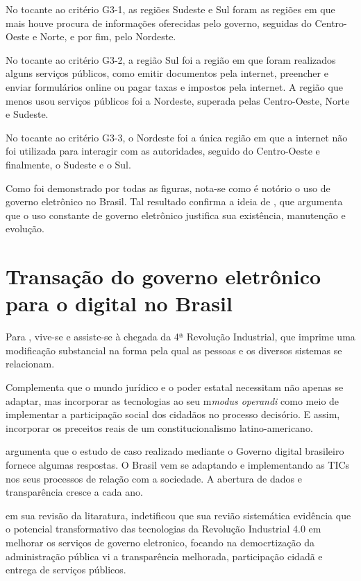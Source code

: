No tocante ao critério G3-1, as regiões Sudeste e Sul foram as regiões em que mais houve procura de informações oferecidas pelo governo, seguidas do Centro-Oeste e Norte, e por fim, pelo Nordeste.

No tocante ao critério G3-2, a região Sul foi a região em que foram realizados alguns serviços públicos, como emitir documentos pela internet, preencher e enviar formulários online ou pagar taxas e impostos pela internet. A região que menos usou serviços públicos foi a Nordeste, superada pelas Centro-Oeste, Norte e Sudeste.

No tocante ao critério G3-3, o Nordeste foi a única região em que a internet não foi utilizada para interagir com as autoridades, seguido do Centro-Oeste e finalmente, o Sudeste e o Sul.

Como foi demonstrado por todas as figuras, nota-se como é notório o uso de governo eletrônico no Brasil. Tal resultado confirma a ideia de \cite{singh2007country}, que argumenta que o uso constante de governo eletrônico justifica sua existência, manutenção e evolução.

\section{Transação do governo eletrônico para o digital no Brasil}

Para \cite{kreuz20184textordfeminine}, vive-se e assiste-se à chegada da 4ª Revolução Industrial, que imprime uma modificação substancial na forma pela qual as pessoas e os diversos sistemas se relacionam. 

Complementa \cite{kreuz20184textordfeminine} que o mundo jurídico e o poder estatal necessitam não apenas se adaptar, mas incorporar as tecnologias ao seu m\textit{modus operandi} como meio de implementar a participação social dos cidadãos no processo decisório. E assim, incorporar os preceitos reais de um constitucionalismo latino-americano.

\cite{kreuz20184textordfeminine} argumenta que o estudo de caso realizado mediante o Governo digital brasileiro fornece algumas respostas. O Brasil vem se adaptando e implementando as TICs nos seus processos de relação com a sociedade. A abertura de dados e transparência cresce a cada ano. 

\cite{kenosi2024industrial} em sua revisão da litaratura, indetificou que sua revião sistemática evidência que o potencial transformativo das tecnologias da Revolução Industrial 4.0 em melhorar os serviços de governo eletronico, focando na democrtização da administração pública vi a transparência melhorada, participação cidadã e entrega de serviços públicos.

